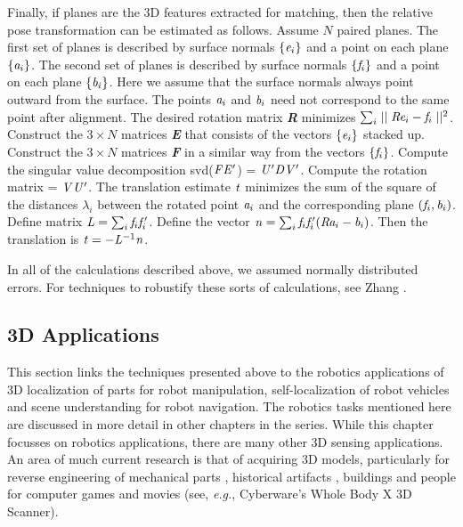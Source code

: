 \documentclass[twocolumn,oneside]{book}
\begin{document}
Finally, if planes are the 3D features extracted for matching, then
the relative pose transformation can be estimated as follows.
Assume $N$ paired planes. 
The first set of planes is described by
surface normals $\{{\bf \it e}_i\}$ and a point on each plane $\{{\bf \it a}_i\}$.
The second set of planes is described by
surface normals $\{{\bf \it f}_i\}$ and a point on each plane $\{{\bf \it b}_i\}$.
Here we assume that the surface normals always point outward from the surface.
The points ${\bf \it a}_i$ and ${\bf \it b}_i$ need not correspond to the same point
after alignment.
The desired rotation matrix {\bf \it R}
 minimizes $\sum_i \mid\mid {\bf \it R}{\bf \it e}_i - {\bf \it f}_i \mid\mid^2$.
Construct the $3 \times N$ matrices {\bf \it E} that consists
of the vectors $\{ {\bf \it e}_i \}$ stacked up.
Construct the $3 \times N$ matrices {\bf \it F} in a similar way from the
vectors $\{ {\bf \it f}_i \}$.
Compute the singular value decomposition svd(${\bf \it F}{\bf \it E'}$) = 
${\bf \it U'}{\bf \it D}{\bf \it V'}$.\cite{arun}
Compute the rotation matrix = ${\bf \it V}{\bf \it U'}$.
The translation estimate ${\bf \it t}$
minimizes the sum of the square of the distances $\lambda_i$
between the rotated point ${\bf \it a}_i$ and the corresponding plane $({\bf \it f}_i,{\bf \it b}_i)$.
Define matrix ${\bf \it L} = \sum_i {\bf \it f}_i{\bf \it f}_i'$.
Define the vector ${\bf \it n}= \sum_i {\bf \it f}_i{\bf \it f}_i' ({\bf \it R}{\bf \it a}_i - {\bf \it b}_i)$.
Then the translation is ${\bf \it t}= - {\bf \it L}^{-1}{\bf \it n}$.

In all of the calculations described above, we assumed normally distributed
errors. For techniques to robustify these sorts of calculations, see
Zhang \cite{zhang}.

\subsection{3D Applications \label{3dapp}}

This section links the techniques presented above to the robotics applications
of 3D localization of parts for
robot manipulation, self-localization of robot vehicles and
scene understanding for robot navigation.
The robotics tasks mentioned here are discussed in more detail
in other chapters in the series.
While this chapter focusses on robotics applications, there are
many other 3D sensing applications. An area of much current research is
that of acquiring 3D models, particularly for reverse engineering of
mechanical parts \cite{benko},
historical artifacts \cite{levoy},
buildings \cite{stamos} and
people for computer games and movies (see, {\it e.g.}, Cyberware's Whole Body X 3D Scanner).
\end{document}
